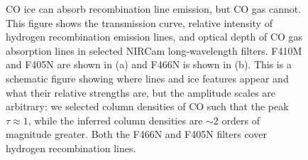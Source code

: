 \documentclass[times,astrosymb,twocolumn]{aastex631}
\def\rr#1{#1}
\begin{document}
\begin{figure}
    \centering
    \caption{\rr{CO ice can absorb recombination line emission, but CO gas cannot.}
    \rr{This figure shows the} transmission curve, \rr{relative intensity} of hydrogen recombination emission lines, and \rr{optical depth of} CO gas absorption lines in \rr{selected} NIRCam long-wavelength filters.
    F410M and F405N are shown in \rr{(a)} and F466N is shown in \rr{(b)}.
    This is a schematic figure showing where lines and ice features appear and what their relative strengths are, but the amplitude scales are arbitrary\rr{: we selected column densities of CO such that the peak $\tau\approx1$, while the inferred column densities are $\sim2$ orders of magnitude greater}.
    Both the F466N and F405N filters cover hydrogen recombination lines.
}
\end{figure}
\end{document}
